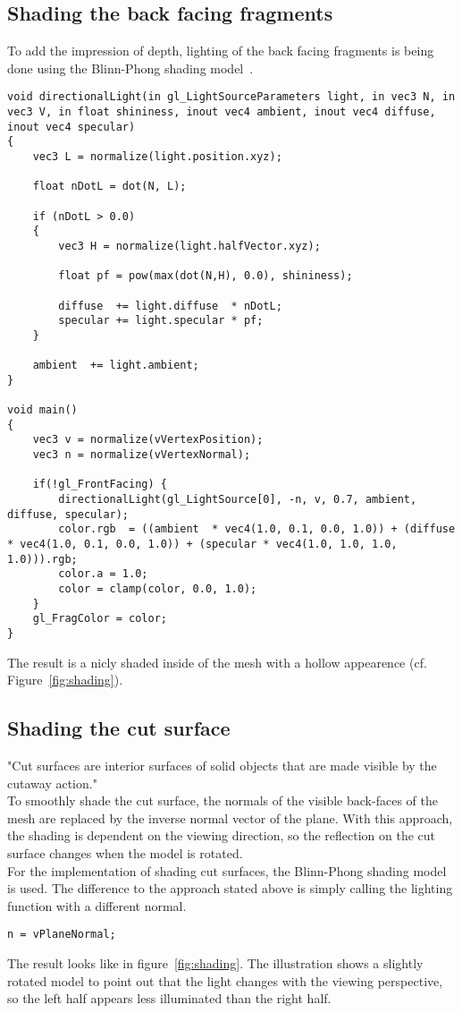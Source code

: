 \subsection{Shading the back facing fragments}
To add the impression of depth, lighting of the back facing fragments is being done using the Blinn-Phong shading model~\cite{book:computerGraphicsHearn}.
\begin{lstlisting}
void directionalLight(in gl_LightSourceParameters light, in vec3 N, in vec3 V, in float shininess, inout vec4 ambient, inout vec4 diffuse, inout vec4 specular)
{
	vec3 L = normalize(light.position.xyz);
	 
	float nDotL = dot(N, L);
	 
	if (nDotL > 0.0)
	{   
		vec3 H = normalize(light.halfVector.xyz);
			 
		float pf = pow(max(dot(N,H), 0.0), shininess);

		diffuse  += light.diffuse  * nDotL;
		specular += light.specular * pf;
	}
	 
	ambient  += light.ambient;
}

void main()
{
	vec3 v = normalize(vVertexPosition);
	vec3 n = normalize(vVertexNormal);
	
	if(!gl_FrontFacing) {
		directionalLight(gl_LightSource[0], -n, v, 0.7, ambient, diffuse, specular);
		color.rgb  = ((ambient  * vec4(1.0, 0.1, 0.0, 1.0)) + (diffuse  * vec4(1.0, 0.1, 0.0, 1.0)) + (specular * vec4(1.0, 1.0, 1.0, 1.0))).rgb;			
		color.a = 1.0;			
		color = clamp(color, 0.0, 1.0);
	}
	gl_FragColor = color;
}
\end{lstlisting}

The result is a nicly shaded inside of the mesh with a hollow appearence (cf. Figure~\ref{fig:shading}).

\subsection{Shading the cut surface}
\label{chap:cutSurface}
"Cut surfaces are interior surfaces of solid objects that are made visible by the cutaway action."~\cite{jour:adaptiveCutaways}\\
To smoothly shade the cut surface, the normals of the visible back-faces of the mesh are replaced by the inverse normal vector of the plane. With this approach, the shading is dependent on the viewing direction, so the reflection on the cut surface changes when the model is rotated.\\
For the implementation of shading cut surfaces, the Blinn-Phong shading model is used. The difference to the approach stated above is simply calling the lighting function with a different normal.
\begin{lstlisting}
n = vPlaneNormal;
\end{lstlisting}
The result looks like in figure~\ref{fig:shading}. The illustration shows a slightly rotated model to point out that the light changes with the viewing perspective, so the left half appears less illuminated than the right half.

